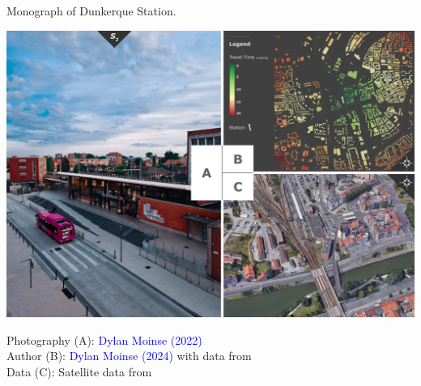 \begin{refsegment}
\begin{carte}[h!]\vspace*{4pt}
\caption{Monograph of Dunkerque Station.}
\label{fig-chap3:monographie-dunkerque}
\centerline{\includegraphics[height=.35\pageheight]{src/Figures/Chap-3/EN_Gare_Dunkerque.jpg}}
\vspace{5pt}
\begin{flushright}\scriptsize{
Photography (A): \textcolor{blue}{Dylan Moinse (2022)}
\\
Author (B): \textcolor{blue}{Dylan Moinse (2024)} with data from \textcolor{blue}{\textcite{openstreetmap_openstreetmap_2023}}
\\
Data (C): Satellite data from \textcolor{blue}{\textcite{google_earth_google_2023}}
}\end{flushright}
\end{carte}


\end{refsegment}
